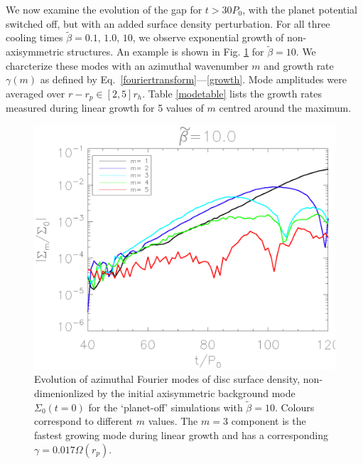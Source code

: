 
We now examine the evolution of the gap for $t>30P_0$, with the
planet potential switched off, but with an added surface density
perturbation. For all three cooling times $\tilde{\beta}=0.1,\, 1.0,\,
10$, we observe exponential growth of non-axisymmetric
structures. %
An example is shown in Fig. \ref{linearmodes} for 
$\tilde{\beta}=10$. We charcterize these
modes with an azimuthal wavenumber $m$ and growth rate $\gamma(m)$ as defined by
Eq.~\ref{fouriertransform}---\ref{growth}. Mode amplitudes were
averaged over $r-r_p\in[2,5]r_h$. Table \ref{modetable}
lists the growth rates measured during 
linear growth for 5 values of $m$ centred around the maximum. 

\begin{figure}
  \includegraphics[width=\linewidth,clip=true,trim=1.2cm
  0cm 0cm 0cm]{figures/linear_stability}
  \caption{Evolution of azimuthal Fourier modes of disc surface
    density, non-dimenionlized by the initial axisymmetric background mode 
    $\Sigma_0(t=0)$ for the
    `planet-off' simulations with $\tilde{\beta}=10$. Colours correspond
    to different $m$ values. The $m=3$ component is the fastest growing
    mode during linear growth and has a corresponding
    $\gamma=0.017\Omega(r_p)$.\label{linearmodes}}
\end{figure}

